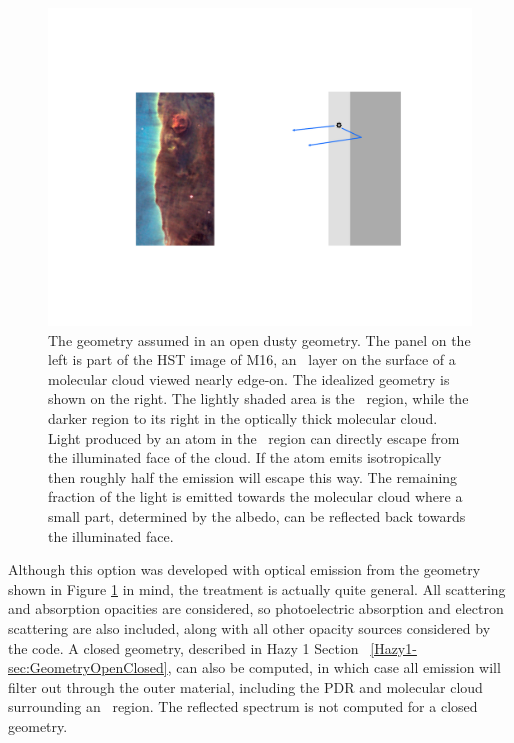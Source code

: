 \begin{figure}
\centering
\includegraphics[scale=0.7]{DustyOpenGeometry}
\caption[Dusty open geometry]{
\label{fig:DustyOpenGeometry}The geometry assumed
in an open dusty geometry.
The panel on the left is part of the HST image of M16, 
an \hplus\ layer on the surface of a molecular cloud
viewed nearly edge-on.
The idealized geometry is shown on the right.
The lightly shaded area is the \hplus\ region,
while the darker region to its right in the
optically thick molecular cloud.
Light produced by an atom in the \hplus\ region can directly
escape from the illuminated face of the cloud.
If the atom emits isotropically then roughly half the emission will escape this way.
The remaining fraction of the light is
emitted towards the molecular cloud where a small part,
determined by the albedo, can be reflected back towards the illuminated face. }
\end{figure}

Although this option was developed with optical emission from the geometry shown in 
Figure \ref{fig:DustyOpenGeometry} in mind, the treatment is actually quite general.
All scattering and absorption opacities are considered, so photoelectric absorption and
electron scattering are also included, along with all other opacity sources considered by the code.
A closed geometry,
described in Hazy 1 Section ~\ref{Hazy1-sec:GeometryOpenClosed},
can also be computed, in which case all emission will filter out through the outer material,
including the PDR and molecular cloud surrounding an \hii\ region. 
The reflected spectrum is not computed for a closed geometry.

